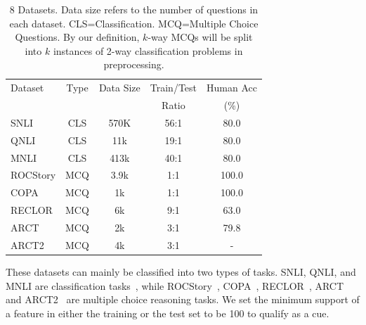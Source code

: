 \begin{table}[th]
\small
\centering
\begin{tabular}{lcccc}\hline
Dataset & Type & Data Size & Train/Test & Human Acc\\ 
 	&	&	& Ratio	& (\%) \\ \hline
SNLI     &CLS   &  570K     & 56:1               &80.0\\
QNLI     &CLS    & 11k         &  19:1           &80.0\\
MNLI     &CLS     & 413k       &  40:1             &80.0\\
ROCStory & MCQ & 3.9k         & 1:1            &100.0  \\
COPA     &MCQ    & 1k           &  1:1         & 100.0     \\
RECLOR   &MCQ    &  6k          &  9:1           &63.0\\
ARCT     &MCQ    & 2k         & 3:1                &79.8\\
ARCT2& MCQ & 4k         & 3:1                 & -\\
\hline
\end{tabular}
\caption{8 Datasets. Data size refers to the number of questions
in each dataset. CLS=Classification. MCQ=Multiple Choice Questions. 
By our definition, $k$-way MCQs will be split into $k$ instances 
of 2-way classification problems in preprocessing.}\label{tab:datasets} 
\end{table}

These datasets can mainly be classified into two types of tasks. 
SNLI, QNLI, and MNLI are classification tasks~\cite{wang2018glue}, while 
ROCStory~\cite{srinivasan2018simple}, COPA~\cite{roemmele2011choice}, 
RECLOR~\cite{yu2020reclor}, %
ARCT and ARCT2~\cite{schuster2019towards} are
multiple choice reasoning tasks. 
We set the minimum support of a feature
in either the training or the test set to be 100 to qualify as a cue.


